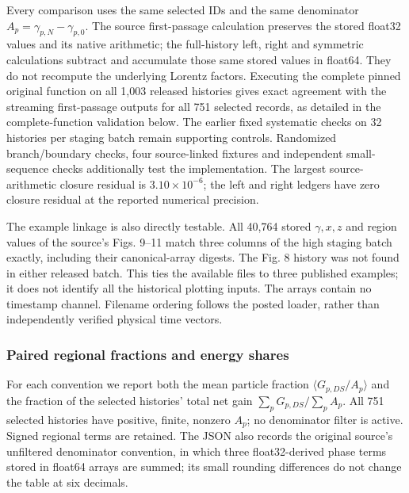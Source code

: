 Every comparison uses the same selected IDs and the same denominator
\(A_p=\gamma_{p,N}-\gamma_{p,0}\). The source first-passage calculation
preserves the stored float32 values and its native arithmetic; the
full-history left, right and symmetric calculations subtract and
accumulate those same stored values in float64. They do not recompute
the underlying Lorentz factors. Executing the complete pinned original
function on all 1,003 released histories gives exact agreement with the
streaming first-passage outputs for all 751 selected records, as
detailed in the complete-function validation below. The earlier fixed
systematic checks on 32 histories per staging batch remain supporting
controls. Randomized branch/boundary checks, four source-linked fixtures
and independent small-sequence checks additionally test the
implementation. The largest source-arithmetic closure residual is
\(3.10\times10^{-6}\); the left and right ledgers have zero closure
residual at the reported numerical precision.

The example linkage is also directly testable. All 40,764 stored
\(\gamma,x,z\) and region values of the source's Figs. 9--11 match three
columns of the high staging batch exactly, including their
canonical-array digests. The Fig. 8 history was not found in either
released batch. This ties the available files to three published
examples; it does not identify all the historical plotting inputs. The
arrays contain no timestamp channel. Filename ordering follows the
posted loader, rather than independently verified physical time vectors.

\subsubsection{Paired regional fractions and energy
shares}\label{paired-regional-fractions-and-energy-shares}

For each convention we report both the mean particle fraction
\(\langle G_{p,DS}/A_p\rangle\) and the fraction of the selected
histories' total net gain \(\sum_pG_{p,DS}/\sum_pA_p\). All 751 selected
histories have positive, finite, nonzero \(A_p\); no denominator filter
is active. Signed regional terms are retained. The JSON also records the
original source's unfiltered denominator convention, in which three
float32-derived phase terms stored in float64 arrays are summed; its
small rounding differences do not change the table at six decimals.

